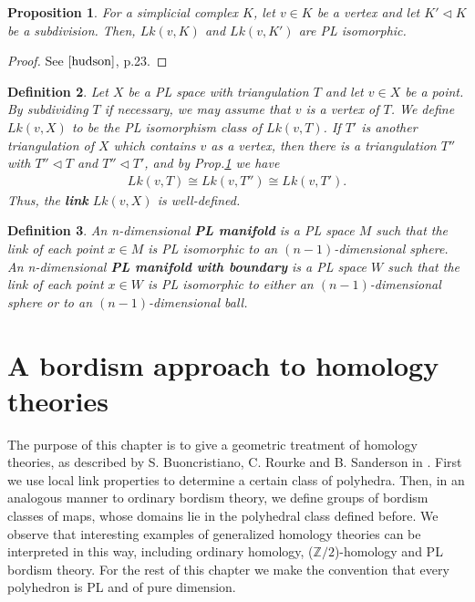 \documentclass{scrreprt}
\newtheorem{prop}{Proposition}[chapter]
\newtheorem{definition}[prop]{Definition}
\begin{document}
\begin{prop}\label{subdivisionlink}
For a simplicial complex $K$, let $v \in K$ be a vertex and let $K' \lhd K$ be a subdivision. Then, $Lk(v,K)$ and $Lk(v,K')$ are PL isomorphic.
\end{prop}

\begin{proof}
See $\cite{hudson}$, p.23.
\end{proof}

\begin{definition}
Let $X$ be a PL space with triangulation $T$ and let $v \in X$ be a point. By subdividing $T$ if necessary, we may assume that $v$ is a vertex of $T$. We define $Lk(v,X)$ to be the PL isomorphism class of $Lk(v,T)$. If $T'$ is another triangulation of $X$ which contains $v$ as a vertex, then there is a triangulation $T''$ with $T'' \lhd T$ and $T'' \lhd T'$, and by Prop.\ref{subdivisionlink} we have
\begin{align*}
Lk(v,T) \cong Lk(v,T'') \cong Lk(v,T').
\end{align*}
Thus, the \textbf{link} $Lk(v,X)$ is well-defined.
\end{definition}

\begin{definition}
An n-dimensional \textbf{PL manifold} is a PL space $M$ such that the link of each point $x \in M$ is PL isomorphic to an $(n-1)$-dimensional sphere. An n-dimensional \textbf{PL manifold with boundary} is a PL space $W$ such that the link of each point $x \in W$ is PL isomorphic to either an $(n-1)$-dimensional sphere or to an $(n-1)$-dimensional ball.
\end{definition}



\chapter{A bordism approach to homology theories}\label{bordismhomology}
The purpose of this chapter is to give a geometric treatment of homology theories, as described by S. Buoncristiano, C. Rourke and B. Sanderson in \cite{BRS}. First we use local link properties to determine a certain class of polyhedra. Then, in an analogous manner to ordinary bordism theory, we define groups of bordism classes of maps, whose domains lie in the polyhedral class defined before. We observe that interesting examples of generalized homology theories can be interpreted in this way, including ordinary homology, ($\mathbb{Z}/2$)-homology and PL bordism theory. \newline
For the rest of this chapter we make the convention that every polyhedron is PL and of pure dimension.
\end{document}
